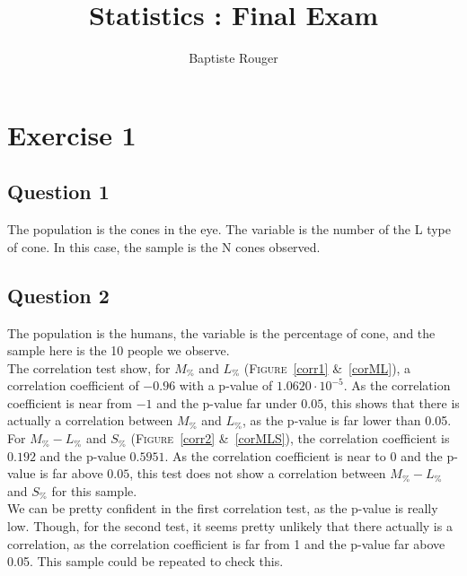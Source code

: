 \documentclass[12pt,a4paper]{article}
\author{Baptiste Rouger}
\title{Statistics : Final Exam}
\begin{document}
\maketitle

\section*{Exercise 1}
\subsection*{Question 1}
The population is the cones in the eye. The variable is the number of the L type of cone. In this case, the sample is the N cones observed.

\subsection*{Question 2}
The population is the humans, the variable is the percentage of cone, and the sample here is the 10 people we observe.\\

The correlation test show, for $M_\%$ and $L_\%$ (\textsc{Figure}~\ref{corr1} \&~\ref{corML}), a correlation coefficient of $-0.96$ with a p-value of $1.0620\cdot 10^{-5}$. As the correlation coefficient is near from $-1$ and the p-value far under $0.05$, this shows that there is actually a correlation between $M_\%$ and $L_\%$, as the p-value is far lower than 0.05.\\

For $M_\% - L_\%$ and $S_\%$ (\textsc{Figure}~\ref{corr2} \&~\ref{corMLS}), the correlation coefficient is $0.192$ and the p-value $0.5951$. As the correlation coefficient is near to $0$ and the p-value is far above $0.05$, this test does not show a correlation between $M_\% - L_\%$ and $S_\%$ for this sample.\\

We can be pretty confident in the first correlation test, as the p-value is really low. Though, for the second test, it seems pretty unlikely that there actually is a correlation, as the correlation coefficient is far from 1 and the p-value far above 0.05. This sample could be repeated to check this.
\end{document}
